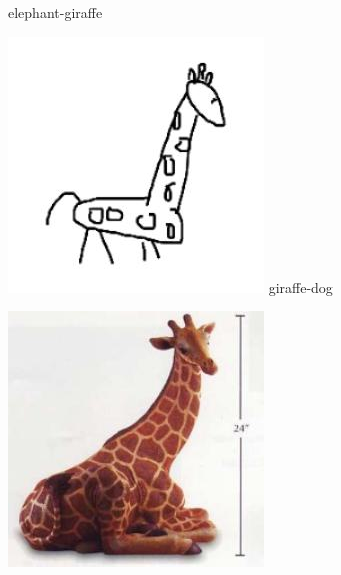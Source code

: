 \documentclass{article}
\begin{document}
\begin{center}
\begin{minipage}{0.142\textwidth}
        elephant-giraffe
    \end{minipage}%
    \begin{minipage}{0.142\textwidth}
        \includegraphics[width=\linewidth]{./pic/misclassified_r2_p0_2723.jpg}
        giraffe-dog
    \end{minipage}%
    \begin{minipage}{0.142\textwidth}
        \includegraphics[width=\linewidth]{./pic/misclassified_r2_p3_2723.jpg}

\end{minipage}
\end{center}
\end{document}
